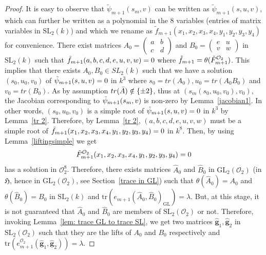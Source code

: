 \documentclass[10pt,twoside]{amsart}
\newcommand{\GL}{\mathrm{GL}}
\newcommand{\SL}{\mathrm{SL}}
\newcommand{\tr}{\mathrm{tr}}
\newcommand{\R}{\mathcal{O}_2}
\theoremstyle{definition}
\theoremstyle{definition}
\begin{document}
\begin{proof}
It is easy to observe that $\tilde \psi_{m+1}(s_m, v)$ can be written as $\widetilde\psi_{m+1}(s, u, v)$, which can further be written as a polynomial in the $8$ variables (entries of matrix variables in $\SL_2(k)$) and which we rename as $\widetilde f_{m+1}(x_1, x_2, x_3, x_4, y_1, y_2, y_3, y_4)$ for convenience. There exist matrices $A_0 =\left (\begin{array}{cc} a&  b \\ c & d \end{array}\right )$ and $B_0 = \left (\begin{array}{cc} e& u \\ v & w \end{array}\right )$ in $\SL_2(k)$ such that $\Tilde{f}_{m+1}(a, b, c, d, e, u, v, w) = 0$ where $\Tilde{f}_{m+1} = \theta(\Tilde{F}_{m+1}^{\R})$. This implies that there exists $A_0, B_0 \in SL_2(k)$ such that we have a solution $(s_0, u_0, v_0)$ of $\Tilde{\psi}_{m+1}(s, u, v) = 0$ in $k^3$ where $s_0 = tr(A_0), u_0 = tr(A_0B_0)$ and $v_0 = tr(B_0)$. As by assumption $tr(\Bar{A})\notin \{\pm2\}$, thus at $(s_m(s_0, u_0, v_0), v_0)$, the Jacobian corresponding to $\Tilde{\psi}_{m+1}(s_m,v)$ is non-zero by Lemma~\ref{jacobian1}. In other words, $(s_0, u_0, v_0)$ is a simple root of $\Tilde{\psi}_{m+1}(s, u, v) = 0$ in $k^3$ by Lemma~\ref{tr 2}. Therefore, by Lemma~\ref{tr 2}, $(a, b, c, d, e, u, v, w)$ must be a simple root of $\Tilde{f}_{m+1}(x_1, x_2, x_3, x_4, y_1, y_2, y_3, y_4) = 0$ in $k^8$. Then, by using Lemma~\ref{liftingsimple} we get 
$$\Tilde{F}_{m+1}^{\R}(x_1, x_2, x_3, x_4, y_1, y_2, y_3, y_4) = 0$$ 
has a solution in $\R^8$. Therefore, there exists matrices $\widehat{A}_0$ and $\widehat{B}_0$ in $\GL_2(\R)$ (in $\mathfrak{H}$, hence in $\GL_2(\mathcal{O}_2)$, see Section~\ref{trace in GL}) such that $\theta(\widehat{A}_0) = A_0$ and $\theta(\widehat{B}_0) = B_0$ in $\SL_2(k)$ and $\tr(e_{m+1}(\widehat{A}_0, \widehat{B}_0)_{\GL}) = \lambda$. But, at this stage, it is not guaranteed that $\widehat{A}_0$ and $\widehat{B}_0$ are members of $\SL_2(\R)$ or not. Therefore, invoking Lemma~\ref{lem: trace GL to trace SL}, we get two matrices $\widehat{\mathbf{g}}_1, \widehat{\mathbf{g}}_2$ in $\SL_2(\R)$ such that they are the lifts of $A_0$ and $B_0$ respectively and $\tr(e_{m+1}^{\R}(\widehat{\mathbf{g}}_1, \widehat{\mathbf{g}}_2)) = \lambda$.


\end{proof}
\end{document}

